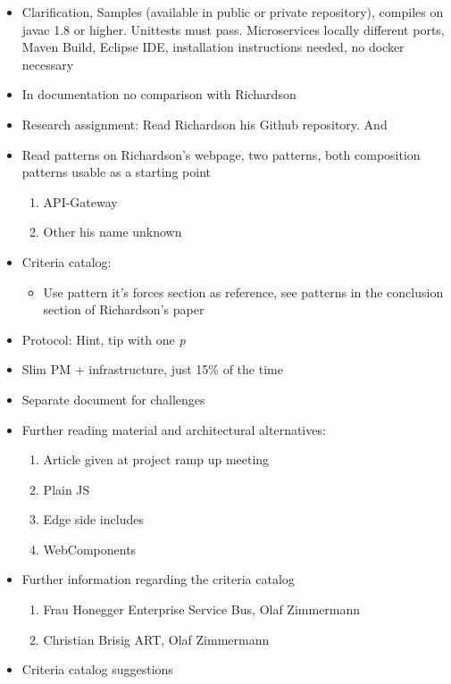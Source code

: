 \documentclass{article}
\begin{document}
\begin{itemize}
    \item Clarification, Samples (available in public or private repository), compiles on javac 1.8 or higher. Unittests must pass. Microservices locally different ports, Maven Build, Eclipse IDE, installation instructions needed, no docker necessary
    \item In documentation no comparison with Richardson
    \item Research assignment: Read Richardson his Github repository. And 
    \item Read patterns on Richardson's webpage, two patterns, both composition patterns usable as a starting point
        \begin{enumerate}
            \item API-Gateway
            \item Other his name unknown 
        \end{enumerate}
    \item Criteria catalog:
        \begin{itemize}
            \item Use pattern it's forces section as reference, see patterns in the conclusion section of Richardson's paper
        \end{itemize}
    \item Protocol: Hint, tip with one \textit{p}
    \item Slim PM + infrastructure, just 15\% of the time
    \item Separate document for challenges
    \item Further reading material and architectural alternatives:
        \begin{enumerate}
            \item Article given at project ramp up meeting
            \item Plain JS
            \item Edge side includes
            \item WebComponents
        \end{enumerate}
    \item Further information regarding the criteria catalog
        \begin{enumerate}
            \item Frau Honegger Enterprise Service Bus, Olaf Zimmermann
            \item Christian Brisig ART, Olaf Zimmermann
        \end{enumerate}
    \item Criteria catalog suggestions

\end{itemize}
\end{document}
